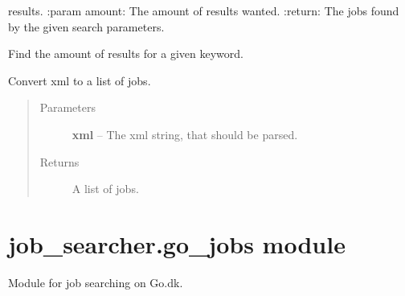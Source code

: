 \documentclass[letterpaper,10pt,english]{sphinxmanual}
\begin{document}
\begin{fulllineitems}
\begin{fulllineitems}
\begin{quote}
\begin{description}
\end{description}\end{quote}

results.
:param amount: The amount of results wanted.
:return: The jobs found by the given search parameters.

\end{fulllineitems}


\begin{fulllineitems}
\label{job_searcher:job_searcher.career_builder.CareerBuilder.find_results_amount}
Find the amount of results for a given keyword.

\end{fulllineitems}


\begin{fulllineitems}
\label{job_searcher:job_searcher.career_builder.CareerBuilder.xml_to_jobs}
Convert xml to a list of jobs.
\begin{quote}\begin{description}
\item[{Parameters}] \leavevmode
\textbf{xml} -- The xml string, that should be parsed.

\item[{Returns}] \leavevmode
A list of jobs.

\end{description}\end{quote}

\end{fulllineitems}


\end{fulllineitems}



\section{job\_searcher.go\_jobs module}
\label{job_searcher:module-job_searcher.go_jobs}\label{job_searcher:job-searcher-go-jobs-module}
Module for job searching on Go.dk.
\end{document}
